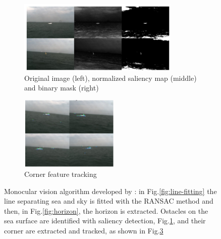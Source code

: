 \documentclass[12pt]{article}
\begin{document}
\begin{figure}
            \begin{subfigure}[b]{.40\linewidth}
            \includegraphics[width=\linewidth, height= 3.5cm]{./Images/Wang/saliency}
            \caption{Original image (left), normalized saliency map (middle) and binary mask (right)}\label{fig:saliency}
            \end{subfigure}
            \begin{subfigure}[b]{.40\linewidth}
            \includegraphics[width=\linewidth, height= 3.5cm]{./Images/Wang/corner}
            \caption{Corner feature tracking}\label{fig:corner}
            \end{subfigure}
            \caption{Monocular vision algorithm developed by \textcite{Wang2011}: in Fig.\ref{fig:line-fitting} the line separating sea and sky is fitted with the RANSAC method and then, in Fig.\ref{fig:horizon}, the horizon is extracted. Ostacles on the sea surface are identified with saliency detection, Fig.\ref{fig:saliency}, and their corner are extracted and tracked, as shown in Fig.\ref{fig:corner}}
      \end{figure}
\end{document}
